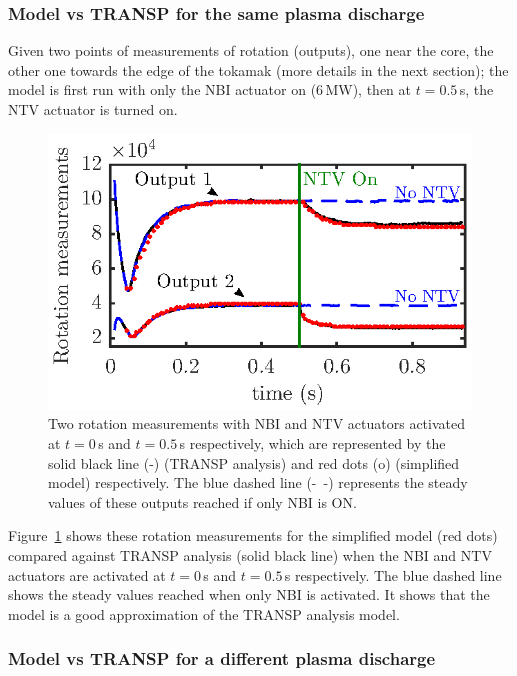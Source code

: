 \documentclass[12pt]{iopart}
\begin{document}
\subsubsection{Model vs TRANSP for the same plasma discharge}
Given two points of measurements of rotation (outputs), one near the core, the other one towards the edge of the tokamak (more details in the next section); the model is first run with only the NBI actuator on ($6$\,MW), then at $t=0.5$\,s, the NTV actuator is turned on. 

\begin{figure}
\centering
\includegraphics{imene_figs/fig9} %
\caption{Two rotation measurements with NBI and NTV actuators activated at $t=0$\,s and $t=0.5$\,s respectively, which are represented by the solid black line (-) (TRANSP analysis) and red dots (o) (simplified model) respectively. The blue dashed line (-~-) represents the steady values of these outputs reached if only NBI is ON.}
\label{Goum12}
\end{figure}

Figure~\ref{Goum12} shows these rotation measurements for the simplified model (red dots) compared against TRANSP analysis (solid black line) when the NBI and NTV actuators are activated at $t=0$\,s and $t=0.5$\,s respectively. The blue dashed line shows the steady values reached when only NBI is activated. It shows that the model is a good approximation of the TRANSP analysis model.



\subsubsection{Model vs TRANSP for a different plasma discharge}
\end{document}

